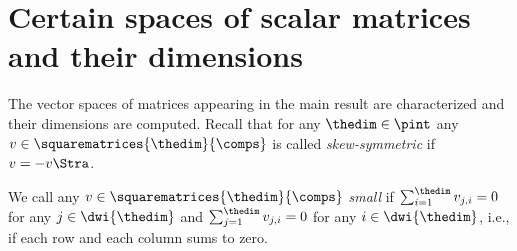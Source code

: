 \documentclass[pdftex]{sigma}
\numberwithin{equation}{section}
\begin{document}
\section{Certain spaces of scalar matrices and their dimensions}
\label{section:dimensions}

  {
  \newcommand{\themat}{v}
  The vector spaces of matrices appearing in the main result are characterized and their dimensions are computed.
  Recall that for any $\thedim\in\pint$ any $\themat\in\squarematrices{\thedim}{\comps}$ is called \emph{skew-symmetric} if $\themat=-\themat\Stra$.
  }

  \begin{Definition}
    \label{definition:small-matrix}
  \newcommand{\themat}{v}
  \newcommand{\thematx}[2]{v_{#1,#2}}
  \newcommand{\indi}{i}
  \newcommand{\indj}{j}
  We call any $\themat\in\squarematrices{\thedim}{\comps}$ \emph{small} if $\sum_{\indi=1}^\thedim\thematx{\indj}{\indi}=0$ for any $\indj\in\dwi{\thedim}$ and $\sum_{\indj=1}^\thedim\thematx{\indj}{\indi}=0$ for any $\indi\in\dwi{\thedim}$, i.e., if each row and each column sums to zero.
\end{Definition}
\end{document}
